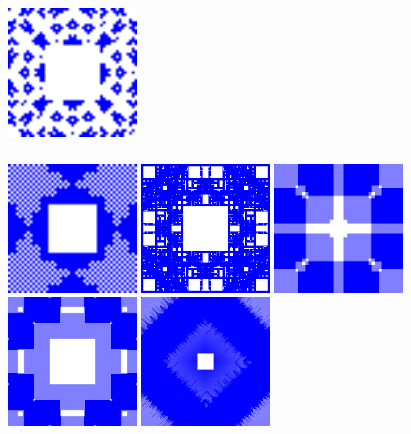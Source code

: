 \begin{frame}
  \includegraphics[width=3.4cm]{68-pretty}
\end{frame}
\begin{frame}
  \frametitle{\problemtitle}
  \includegraphics[width=3.4cm]{69-pretty}
  \includegraphics[width=3.4cm]{71-pretty}
  \includegraphics[width=3.4cm]{72-pretty}
  \includegraphics[width=3.4cm]{73-pretty}
  \includegraphics[width=3.4cm]{74-pretty}

\end{frame}

